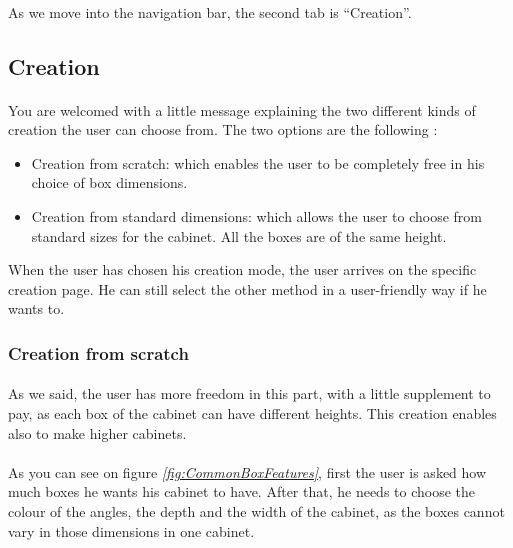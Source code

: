 \documentclass[12pt,oneside]{report}
\begin{document}
        \paragraph{}
        As we move into the navigation bar, the second tab is “Creation”. 
        \vspace{\baselineskip}
        \vspace{\baselineskip}
        
    \subsection{Creation}
        \paragraph{}
        You are welcomed with a little message explaining the two different kinds of creation the user can choose from. The two options are the following : 
        
        \begin{itemize}
            \item Creation from scratch: which enables the user to be completely free in his choice of box dimensions.
            \item Creation from standard dimensions: which allows the user to choose from standard sizes for the cabinet. All the boxes are of the same height.
        \end{itemize}
        \vspace{\baselineskip}
        
        When the user has chosen his creation mode, the user arrives on the specific creation page. He can still select the other method in a user-friendly way if he wants to.

        \newpage
    
        \subsubsection{Creation from scratch}
            \paragraph{}
            As we said, the user has more freedom in this part, with a little supplement to pay, as each box of the cabinet can have different heights. This creation enables also to make higher cabinets.
            
            \paragraph{}
            As you can see on figure \textit{\ref{fig:CommonBoxFeatures}}, first the user is asked how much boxes he wants his cabinet to have. After that, he needs to choose the colour of the angles, the depth and the width of the cabinet, as the boxes cannot vary in those dimensions in one cabinet. 
            
\end{document}
